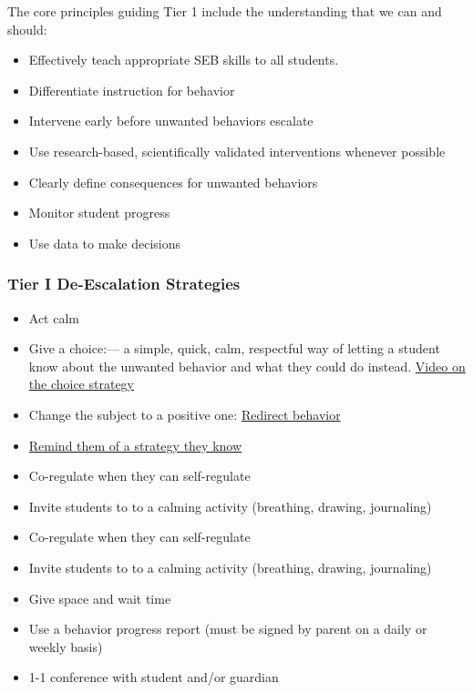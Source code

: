 \documentclass[11pt, letterpaper]{article}
\begin{document}
The core principles guiding Tier 1 include the understanding that we can and should:
\begin{itemize}
\item Effectively teach appropriate SEB skills to all students.
\item Differentiate instruction for behavior
\item Intervene early before unwanted behaviors escalate
\item Use research-based, scientifically validated interventions whenever possible 
\item Clearly define consequences for unwanted behaviors
\item Monitor student progress
\item Use data to make decisions
\end{itemize}
\subsubsection{Tier I De-Escalation Strategies}
\begin{itemize}
\item Act calm
\item Give a choice:— a simple, quick, calm, respectful way of letting a student know about the unwanted behavior and what they could do instead. \href{https://www.instagram.com/reel/CfmyGhJgWzb/?utm_source=ig_embed&ig_rid=a26d419e-f673-4b9f-8a6a-0d678307a527}{Video on the choice strategy}
\item Change the subject to a positive one: \href{https://www.instagram.com/reel/CUWGczxARq_/?utm_source=ig_embed&ig_rid=fd9f8bf6-5411-4874-9486-3ba446bc2fc0}{Redirect behavior}
\item \href{https://www.pbisapps.org/articles/slow-the-climb-4-de-escalation-strategies-to-keep-behavior-from-going-downhill}{Remind them of a strategy they know}
\item Co-regulate when they can self-regulate
\item Invite students to to a calming activity (breathing, drawing, journaling)
\item Co-regulate when they can self-regulate
\item Invite students to to a calming activity (breathing, drawing, journaling)
\item Give space and wait time
\item Use a behavior progress report (must be signed by parent on a daily or weekly basis)
\item 1-1 conference with student and/or guardian
\end{itemize}
\end{document}
